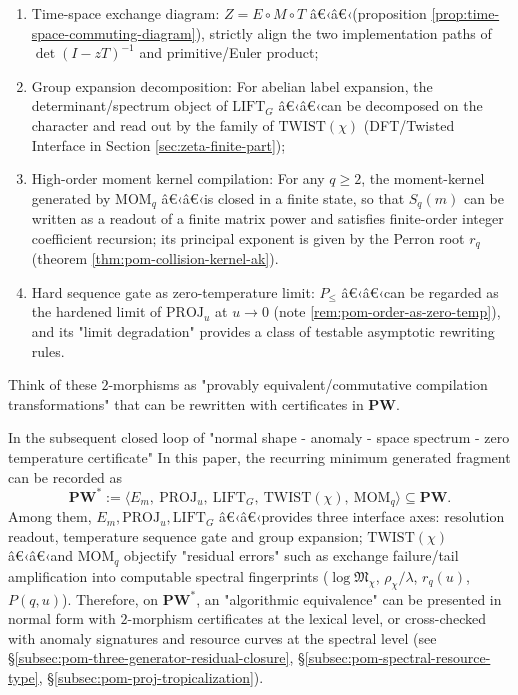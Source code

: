 \begin{definition}
\begin{itemize}
\begin{enumerate}
    \item Time-space exchange diagram: $Z=E\circ M\circ T$ â€‹â€‹(proposition \ref{prop:time-space-commuting-diagram}), strictly align the two implementation paths of $\det(I-zT)^{-1}$ and primitive/Euler product;
    \item Group expansion decomposition: For abelian label expansion, the determinant/spectrum object of $\mathrm{LIFT}_G$ â€‹â€‹can be decomposed on the character and read out by the family of $\mathrm{TWIST}(\chi)$ (DFT/Twisted Interface in Section \ref{sec:zeta-finite-part});
    \item High-order moment kernel compilation: For any \(q\ge2\), the moment-kernel generated by $\mathrm{MOM}_q$ â€‹â€‹is closed in a finite state, so that \(S_q(m)\) can be written as a readout of a finite matrix power and satisfies finite-order integer coefficient recursion; its principal exponent is given by the Perron root \(r_q\) (theorem \ref{thm:pom-collision-kernel-ak}).
    \item Hard sequence gate as zero-temperature limit: $P_{\le}$ â€‹â€‹can be regarded as the hardened limit of $\mathrm{PROJ}_u$ at $u\to 0$ (note \ref{rem:pom-order-as-zero-temp}), and its "limit degradation" provides a class of testable asymptotic rewriting rules.
  \end{enumerate}
\end{itemize}
Think of these $2$-morphisms as "provably equivalent/commutative compilation transformations" that can be rewritten with certificates in $\mathbf{PW}$.
\end{definition}

\begin{remark}\label{rem:pom-pw-star-fragment}
In the subsequent closed loop of "normal shape - anomaly - space spectrum - zero temperature certificate" In this paper, the recurring minimum generated fragment can be recorded as
\[
\mathbf{PW}^{\ast}:=\langle E_m,\ \mathrm{PROJ}_u,\ \mathrm{LIFT}_G,\ \mathrm{TWIST}(\chi),\ \mathrm{MOM}_q\rangle\subseteq \mathbf{PW}.
\]
Among them, \(E_m,\mathrm{PROJ}_u,\mathrm{LIFT}_G\) â€‹â€‹provides three interface axes: resolution readout, temperature sequence gate and group expansion;
\(\mathrm{TWIST}(\chi)\) â€‹â€‹and \(\mathrm{MOM}_q\) objectify "residual errors" such as exchange failure/tail amplification into computable spectral fingerprints (\(\log\mathfrak{M}_\chi\), \(\rho_\chi/\lambda\), \(r_q(u)\), \(P(q,u)\)).
Therefore, on \(\mathbf{PW}^{\ast}\), an "algorithmic equivalence" can be presented in normal form with \(2\)-morphism certificates at the lexical level, or cross-checked with anomaly signatures and resource curves at the spectral level (see \S\ref{subsec:pom-three-generator-residual-closure}, \S\ref{subsec:pom-spectral-resource-type}, \S\ref{subsec:pom-proj-tropicalization}).
\end{remark}

